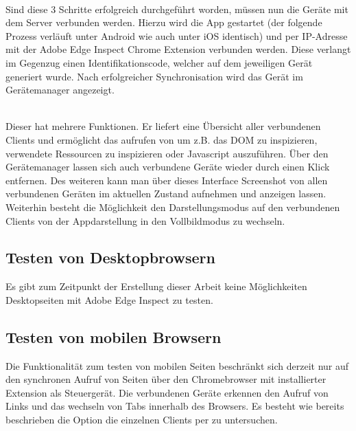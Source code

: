 		\\Sind diese 3 Schritte erfolgreich durchgeführt worden, müssen nun die Geräte mit dem Server verbunden werden. Hierzu 		wird die App gestartet (der folgende Prozess verläuft unter Android wie auch unter iOS identisch) und per IP-Adresse mit 			der Adobe Edge Inspect Chrome Extension verbunden werden. Diese verlangt im Gegenzug einen Identifikationscode, 			welcher auf dem jeweiligen Gerät generiert wurde. Nach erfolgreicher Synchronisation wird das Gerät im Gerätemanager 		angezeigt.

		\\Dieser hat mehrere Funktionen. Er liefert eine Übersicht aller verbundenen Clients und ermöglicht das aufrufen von 			 um z.B. das DOM zu inspizieren, verwendete Ressourcen zu inspizieren oder Javascript auszuführen. Über 			den Gerätemanager lassen sich auch verbundene Geräte wieder durch einen Klick entfernen. Des weiteren kann man über 		dieses Interface Screenshot von allen verbundenen Geräten im aktuellen Zustand aufnehmen und anzeigen lassen. 			Weiterhin besteht die Möglichkeit den Darstellungsmodus auf den verbundenen Clients von der Appdarstellung in den 			Vollbildmodus zu wechseln.
		
		\subsection{Testen von Desktopbrowsern}
		Es gibt zum Zeitpunkt der Erstellung dieser Arbeit keine Möglichkeiten Desktopseiten mit Adobe Edge Inspect zu testen.
		
		\subsection{Testen von mobilen Browsern}
		Die Funktionalität zum testen von mobilen Seiten beschränkt sich derzeit nur auf den synchronen Aufruf von Seiten über 			den Chromebrowser mit installierter Extension als Steuergerät. Die verbundenen Geräte erkennen den Aufruf von Links 			und das wechseln von Tabs innerhalb des Browsers. Es besteht wie bereits beschrieben die Option die einzelnen Clients 			per  zu untersuchen.
		
